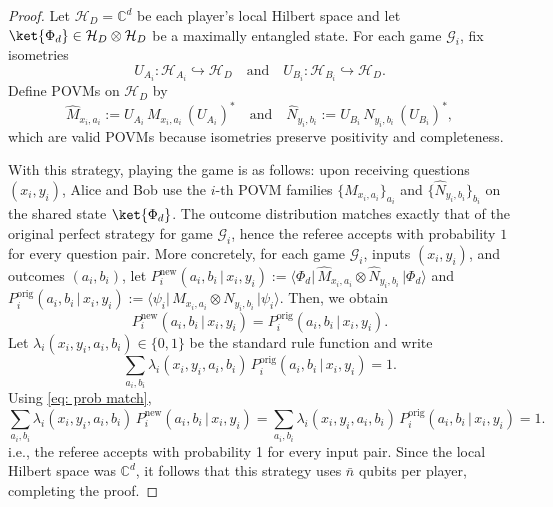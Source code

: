 \documentclass{article}
\begin{document}
    \begin{proof}
        Let $\mathcal{H}_D=\mathbb{C}^d$ be each player's local Hilbert space and let $\ket{\Phi_d}\in \mathcal{H}_D\otimes \mathcal{H}_D$ be a maximally entangled state. For each game $\mathcal{G}_i$, fix isometries 
        \begin{equation}
            U_{A_i}: \mathcal{H}_{A_i}\hookrightarrow \mathcal{H}_D \quad\text{and}\quad U_{B_i}: \mathcal{H}_{B_i}\hookrightarrow \mathcal{H}_D.
        \end{equation}
        Define POVMs on $\mathcal{H}_D$ by 
        \begin{equation}
            \widehat{M}_{x_i,a_i}:=U_{A_i}\,M_{x_i,a_i}\,(U_{A_i})^* \quad\text{and}\quad \widehat{N}_{y_i,b_i}:=U_{B_i}\,N_{y_i,b_i}\,(U_{B_i})^*,
        \end{equation}
        which are valid POVMs because isometries preserve positivity and completeness. 

        With this strategy, playing the game is as follows: upon receiving questions $(x_i,y_i)$, Alice and Bob use the $i$-th POVM families $\{\widehat{M}_{x_i,a_i}\}_{a_i}$ and $\{\widehat{N}_{y_i,b_i}\}_{b_i}$ on the shared state $\ket{\Phi_d}$. The outcome distribution matches exactly that of the original perfect strategy for game $\mathcal{G}_i$, hence the referee accepts with probability $1$ for every question pair. More concretely, for each game $\mathcal{G}_i$, inputs $(x_i,y_i)$, and outcomes $(a_i,b_i)$, let $P^{\mathrm{new}}_i(a_i,b_i\,|\,x_i,y_i) := \big\langle \Phi_d \big|\, \widehat M_{x_i,a_i}\otimes \widehat N_{y_i,b_i} \,\big| \Phi_d \big\rangle$ and $P^{\mathrm{orig}}_i(a_i,b_i\,|\,x_i,y_i):=\big\langle \psi_i \big|\, M_{x_i,a_i}\otimes N_{y_i,b_i} \,\big| \psi_i \big\rangle $. Then, we obtain 
        \begin{equation}\label{eq: prob match} P^{\mathrm{new}}_i(a_i,b_i\,|\,x_i,y_i)= P^{\mathrm{orig}}_i(a_i,b_i\,|\,x_i,y_i).
    \end{equation}
    Let $\lambda_i(x_i,y_i,a_i,b_i)\in\{0,1\}$ be the standard rule function and write 
    \begin{equation}
        \sum_{a_i,b_i} \lambda_i(x_i,y_i,a_i,b_i)\,P^{\mathrm{orig}}_i(a_i,b_i\,|\,x_i,y_i)=1.
    \end{equation}
    Using \eqref{eq: prob match},
    \begin{equation}
        \sum_{a_i,b_i} \lambda_i(x_i,y_i,a_i,b_i)\,P^{\mathrm{new}}_i(a_i,b_i\,|\,x_i,y_i) =\sum_{a_i,b_i} \lambda_i(x_i,y_i,a_i,b_i)\,P^{\mathrm{orig}}_i(a_i,b_i\,|\,x_i,y_i) =1.
    \end{equation}
    i.e., the referee accepts with probability 1 for every input pair. Since the local Hilbert space was $\mathbb{C}^d$, it follows that this strategy uses $\bar{n}$ qubits per player, completing the proof. 
    \end{proof}       
  
\end{document}
